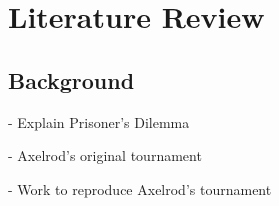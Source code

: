 \chapter{Literature Review}\label{cha:literature_review}

\section{Background}

- Explain Prisoner's Dilemma

- Axelrod's original tournament

- Work to reproduce Axelrod's tournament ~\cite{Knight2016}


